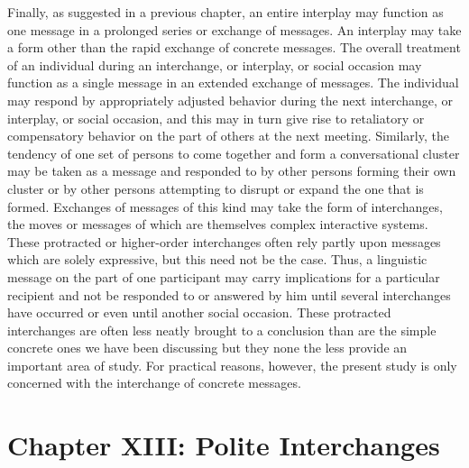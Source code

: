 \documentclass[openany,nobib]{tufte-book}
\let\oldchapter\chapter
\def\chapter{%
  \setcounter{footnote}{0}%
  \oldchapter
}
\begin{document}
Finally, as suggested in a previous chapter, an entire interplay may
function as one message in a prolonged series or exchange of messages.
An interplay may take a form other than the rapid exchange of concrete
messages. The overall treatment of an individual during an interchange,
or interplay, or social occasion may function as a single message in an
extended exchange of messages. The individual may respond by
appropriately adjusted behavior during the next interchange, or
interplay, or social occasion, and this may in turn give rise to
retaliatory or compensatory behavior on the part of others at the next
meeting. Similarly, the tendency of one set of persons to come together
and form a conversational cluster may be taken as a message and
responded to by other persons forming their own cluster or by other
persons attempting to disrupt or expand the one that is formed.
Exchanges of messages of this kind may take the form of interchanges,
the moves or messages of which are themselves complex interactive
systems. These protracted or higher-order interchanges often rely partly
upon messages which are solely expressive, but this need not be the
case. Thus, a linguistic message on the part of one participant may
carry implications for a particular recipient and not be responded to or
answered by him until several interchanges have occurred or even until
another social occasion. These protracted interchanges are often less
neatly brought to a conclusion than are the simple concrete ones we have
been discussing but they none the less provide an important area of
study. For practical reasons, however, the present study is only
concerned with the interchange of concrete messages.

\chapter[CHAPTER XIII: POLITE INTERCHANGES]{Chapter XIII: Polite Interchanges}
\label{ch:Chapter XIII: Polite Interchanges}
\end{document}
